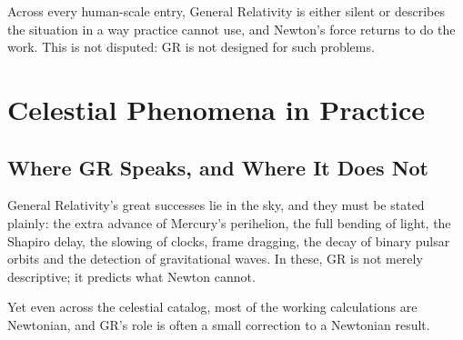 \documentclass[11pt,a4paper]{article}
\begin{document}
Across every human-scale entry, General Relativity is either silent or describes the situation in a way practice cannot use, and Newton's force returns to do the work. This is not disputed: GR is not designed for such problems. 

\section{Celestial Phenomena in Practice}

\subsection{Where GR Speaks, and Where It Does Not}

General Relativity's great successes lie in the sky, and they must be stated plainly: the extra advance of Mercury's perihelion, the full bending of light, the Shapiro delay, the slowing of clocks, frame dragging, the decay of binary pulsar orbits and the detection of gravitational waves. In these, GR is not merely descriptive; it predicts what Newton cannot.

Yet even across the celestial catalog, most of the working calculations are Newtonian, and GR's role is often a small correction to a Newtonian result.
\end{document}
